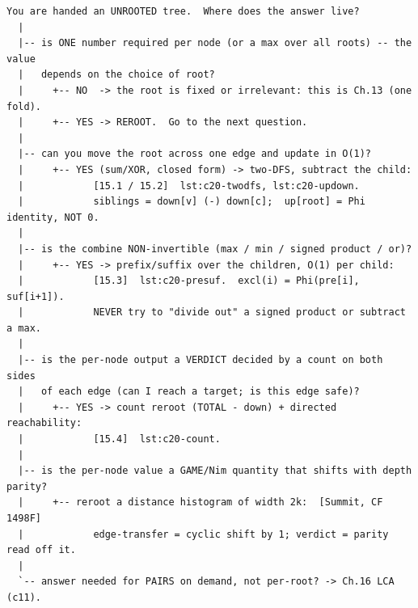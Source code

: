 \begin{lstlisting}[language={}, basicstyle=\ttfamily\small, numbers=none, frame=single]
  You are handed an UNROOTED tree.  Where does the answer live?
  |
  |-- is ONE number required per node (or a max over all roots) -- the value
  |   depends on the choice of root?
  |     +-- NO  -> the root is fixed or irrelevant: this is Ch.13 (one fold).
  |     +-- YES -> REROOT.  Go to the next question.
  |
  |-- can you move the root across one edge and update in O(1)?
  |     +-- YES (sum/XOR, closed form) -> two-DFS, subtract the child:
  |            [15.1 / 15.2]  lst:c20-twodfs, lst:c20-updown.
  |            siblings = down[v] (-) down[c];  up[root] = Phi identity, NOT 0.
  |
  |-- is the combine NON-invertible (max / min / signed product / or)?
  |     +-- YES -> prefix/suffix over the children, O(1) per child:
  |            [15.3]  lst:c20-presuf.  excl(i) = Phi(pre[i], suf[i+1]).
  |            NEVER try to "divide out" a signed product or subtract a max.
  |
  |-- is the per-node output a VERDICT decided by a count on both sides
  |   of each edge (can I reach a target; is this edge safe)?
  |     +-- YES -> count reroot (TOTAL - down) + directed reachability:
  |            [15.4]  lst:c20-count.
  |
  |-- is the per-node value a GAME/Nim quantity that shifts with depth parity?
  |     +-- reroot a distance histogram of width 2k:  [Summit, CF 1498F]
  |            edge-transfer = cyclic shift by 1; verdict = parity read off it.
  |
  `-- answer needed for PAIRS on demand, not per-root? -> Ch.16 LCA (c11).
\end{lstlisting}


